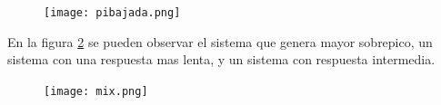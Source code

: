     \begin{figure}[H]
    	\centering
    	\texttt{[image: pibajada.png]}
    	\label{fig:pibajada}
    \end{figure}
    
    
    En la figura \ref{fig:mix} se pueden observar el sistema que genera mayor sobrepico, un sistema con una respuesta mas lenta, y un sistema con respuesta intermedia. 
    \begin{figure}[h!]
    	\centering
    	\texttt{[image: mix.png]}
    	\label{fig:mix}
    \end{figure}
    
    \newpage